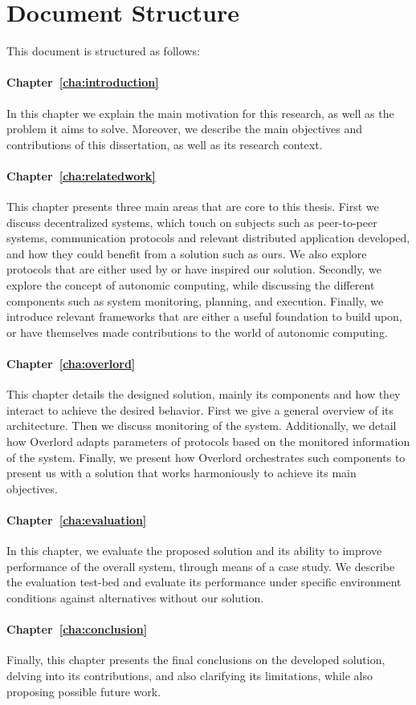 \section*{Document Structure}
\label{sec:document_structure}

This document is structured as follows:

\paragraph{Chapter~\ref{cha:introduction}} In this chapter we explain the main motivation for this research, as well as the problem it aims to solve. Moreover, we describe the main objectives and contributions of this dissertation, as well as its research context.

\paragraph{Chapter~\ref{cha:relatedwork}} This chapter presents three main areas that are core to this thesis. First we discuss decentralized systems, which touch on subjects such as peer-to-peer systems, communication protocols and relevant distributed application developed, and how they could benefit from a solution such as ours. We also explore protocols that are either used by or have inspired our solution. Secondly, we explore the concept of autonomic computing, while discussing the different components such as system monitoring, planning, and execution. Finally, we introduce relevant frameworks that are either a useful foundation to build upon, or have themselves made contributions to the world of autonomic computing.

\paragraph{Chapter~\ref{cha:overlord}} This chapter details the designed solution, mainly its components and how they interact to achieve the desired behavior. First we give a general overview of its architecture. Then we discuss monitoring of the system. Additionally, we detail how Overlord adapts parameters of protocols based on the monitored information of the system. Finally, we present how Overlord orchestrates such components to present us with a solution that works harmoniously to achieve its main objectives.

\paragraph{Chapter~\ref{cha:evaluation}} In this chapter, we evaluate the proposed solution and its ability to improve performance of the overall system, through means of a case study. We describe the evaluation test-bed and evaluate its performance under specific environment conditions against alternatives without our solution.

\paragraph{Chapter~\ref{cha:conclusion}} Finally, this chapter presents the final conclusions on the developed solution, delving into its contributions, and also clarifying its limitations, while also proposing possible future work.